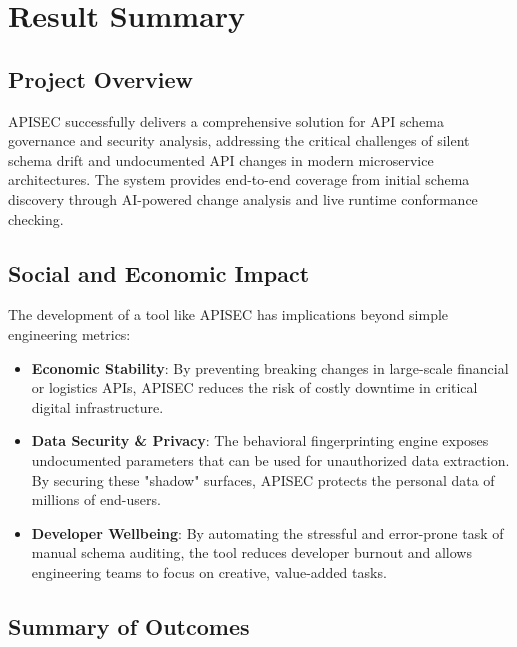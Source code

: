 \documentclass{fisatprojectfinal}
\begin{document}
\chapter{Result Summary}
\section{Project Overview}
APISEC successfully delivers a comprehensive solution for API schema governance and security analysis, addressing the critical challenges of silent schema drift and undocumented API changes in modern microservice architectures. The system provides end-to-end coverage from initial schema discovery through AI-powered change analysis and live runtime conformance checking.

\section{Social and Economic Impact}
The development of a tool like APISEC has implications beyond simple engineering metrics:
\begin{itemize}
    \item \textbf{Economic Stability}: By preventing breaking changes in large-scale financial or logistics APIs, APISEC reduces the risk of costly downtime in critical digital infrastructure.
    \item \textbf{Data Security & Privacy}: The behavioral fingerprinting engine exposes undocumented parameters that can be used for unauthorized data extraction. By securing these "shadow" surfaces, APISEC protects the personal data of millions of end-users.
    \item \textbf{Developer Wellbeing}: By automating the stressful and error-prone task of manual schema auditing, the tool reduces developer burnout and allows engineering teams to focus on creative, value-added tasks.
\end{itemize}

\section{Summary of Outcomes}
\end{document}
